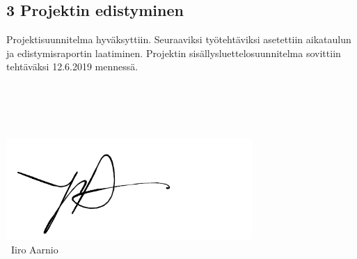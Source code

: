 \documentclass[a4paper, 12pt, finnish]{article}
\begin{document}
\subsection*{3 Projektin edistyminen}
\begin{minipage} [t] {0.4\textwidth}
    \phantom{a}
\end{minipage}
\begin{minipage} [t] {0.6\textwidth}
    Projektisuunnitelma hyväksyttiin. Seuraaviksi työtehtäviksi asetettiin aikataulun ja edistymisraportin laatiminen. Projektin sisällysluettelosuunnitelma sovittiin tehtäväksi 12.6.2019 mennessä.
\end{minipage}
\begin{minipage} [t] {0.4\textwidth}
    \phantom{a}
\end{minipage}
\begin{minipage} [t] {0.6\textwidth}
    \phantom{a}\\\\\\\\
        \includegraphics[width=0.7\textwidth]{sign}
        \\~Iiro Aarnio
\end{minipage}
\end{document}
